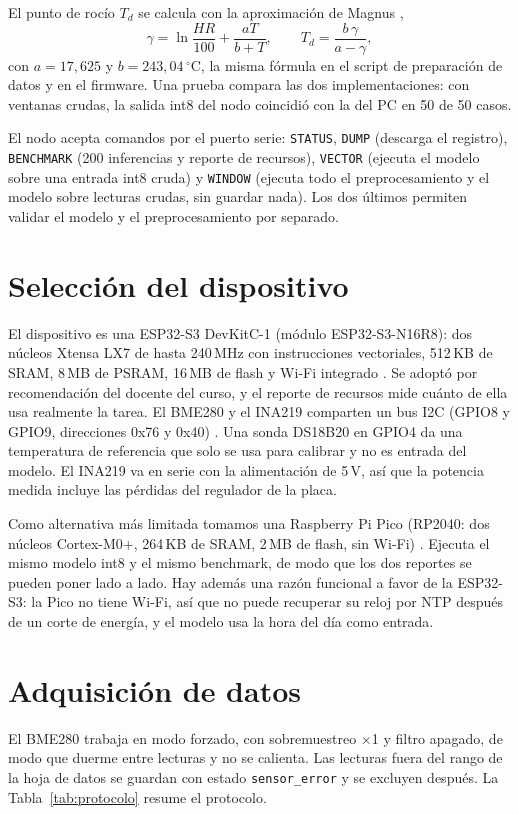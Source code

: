 \documentclass[conference]{IEEEtran}
\begin{document}
El punto de roc\'io $T_d$ se calcula con la aproximaci\'on de Magnus \cite{alduchov1996},
\begin{equation}
\gamma = \ln\frac{HR}{100} + \frac{aT}{b+T}, \qquad T_d = \frac{b\,\gamma}{a-\gamma},
\end{equation}
con $a=17{,}625$ y $b=243{,}04\,^\circ$C, la misma f\'ormula en el script de preparaci\'on de datos y en el firmware. Una prueba compara las dos implementaciones: con ventanas crudas, la salida int8 del nodo coincidi\'o con la del PC en 50 de 50 casos.

El nodo acepta comandos por el puerto serie: \texttt{STATUS}, \texttt{DUMP} (descarga el registro), \texttt{BENCHMARK} (200 inferencias y reporte de recursos), \texttt{VECTOR} (ejecuta el modelo sobre una entrada int8 cruda) y \texttt{WINDOW} (ejecuta todo el preprocesamiento y el modelo sobre lecturas crudas, sin guardar nada). Los dos \'ultimos permiten validar el modelo y el preprocesamiento por separado.

\section{Selecci\'on del dispositivo}
El dispositivo es una ESP32-S3 DevKitC-1 (m\'odulo ESP32-S3-N16R8): dos n\'ucleos Xtensa LX7 de hasta 240\,MHz con instrucciones vectoriales, 512\,KB de SRAM, 8\,MB de PSRAM, 16\,MB de flash y Wi-Fi integrado \cite{esp32s3}. Se adopt\'o por recomendaci\'on del docente del curso, y el reporte de recursos mide cu\'anto de ella usa realmente la tarea. El BME280 y el INA219 comparten un bus I2C (GPIO8 y GPIO9, direcciones 0x76 y 0x40) \cite{bme280}. Una sonda DS18B20 en GPIO4 da una temperatura de referencia que solo se usa para calibrar y no es entrada del modelo. El INA219 va en serie con la alimentaci\'on de 5\,V, as\'i que la potencia medida incluye las p\'erdidas del regulador de la placa.

Como alternativa m\'as limitada tomamos una Raspberry Pi Pico (RP2040: dos n\'ucleos Cortex-M0+, 264\,KB de SRAM, 2\,MB de flash, sin Wi-Fi) \cite{rp2040}. Ejecuta el mismo modelo int8 y el mismo benchmark, de modo que los dos reportes se pueden poner lado a lado. Hay adem\'as una raz\'on funcional a favor de la ESP32-S3: la Pico no tiene Wi-Fi, as\'i que no puede recuperar su reloj por NTP despu\'es de un corte de energ\'ia, y el modelo usa la hora del d\'ia como entrada.

\section{Adquisici\'on de datos}
El BME280 trabaja en modo forzado, con sobremuestreo $\times$1 y filtro apagado, de modo que duerme entre lecturas y no se calienta. Las lecturas fuera del rango de la hoja de datos se guardan con estado \texttt{sensor\_error} y se excluyen despu\'es. La Tabla~\ref{tab:protocolo} resume el protocolo.
\end{document}
